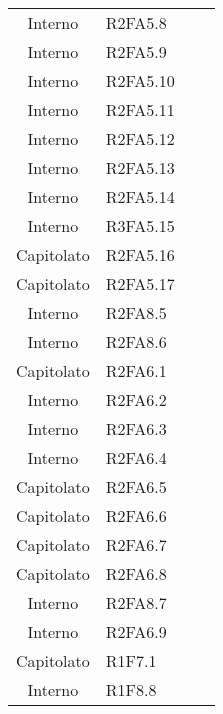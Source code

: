 {\begin{longtable}{ c C{4cm} c c}
Interno & R2FA5.8\\

Interno & R2FA5.9\\

Interno & R2FA5.10\\

Interno & R2FA5.11\\


Interno & R2FA5.12\\

Interno & R2FA5.13\\

Interno & R2FA5.14\\

Interno & R3FA5.15\\

Capitolato & R2FA5.16\\

Capitolato & R2FA5.17\\

Interno & R2FA8.5\\

Interno & R2FA8.6\\

Capitolato & R2FA6.1\\


Interno & R2FA6.2\\

Interno & R2FA6.3\\

Interno & R2FA6.4\\

Capitolato & R2FA6.5\\

Capitolato & R2FA6.6\\

Capitolato & R2FA6.7\\

Capitolato & R2FA6.8\\


Interno & R2FA8.7\\

Interno & R2FA6.9\\

Capitolato & R1F7.1\\

Interno & R1F8.8\\


\end{longtable}}

